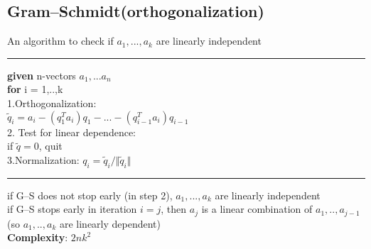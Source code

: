 \subsection{Gram–Schmidt(orthogonalization)}
An algorithm to check if $a_1,...,a_k$ are linearly independent\\
\rule{\linewidth}{0.4pt}
\textbf{given} n-vectors $a_1,...a_n$\\
\textbf{for} i = 1,..,k\\
1.Orthogonalization: \\$\tilde{q}_i = a_i - (q^T_1 a_i)q_1 - ... - (q^T_{i-1}a_i)q_{i-1}$\\
2. Test for linear dependence: \\if $\tilde{q} = 0$, quit\\
3.Normalization: $q_i = \tilde{q}_i/\Vert \tilde{q}_i\Vert$\\
\rule{\linewidth}{0.4pt}

\textbullet if G–S does not stop early (in step 2), $a_1 , . . . , a_k$ are linearly independent\\
\textbullet if G–S stops early in iteration $i = j$, then $a_j$ is a linear combination of $a_1,..,a_{j-1}$ (so $a_1,..,a_k$ are linearly dependent)\\
\textbf{Complexity}: $2nk^2$

